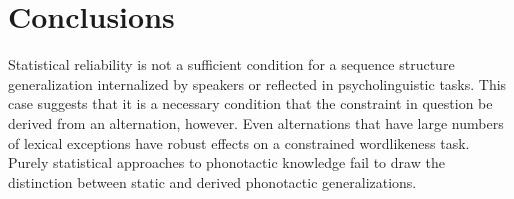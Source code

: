 


\section{Conclusions}

Statistical reliability is not a sufficient condition for a sequence structure generalization internalized by speakers or reflected in psycholinguistic tasks. This case suggests that it is a necessary condition that the constraint in question be derived from an alternation, however. Even alternations that have large numbers of lexical exceptions have robust effects on a constrained wordlikeness task. Purely statistical approaches to phonotactic knowledge fail to draw the distinction between static and derived phonotactic generalizations.

